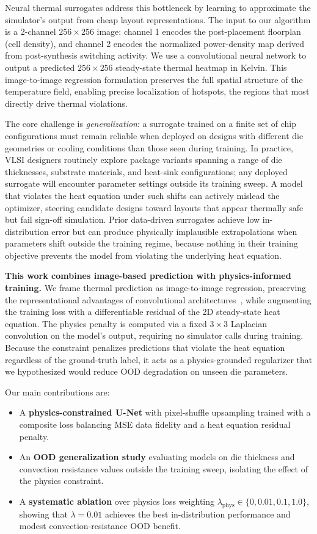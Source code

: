 \documentclass[10pt,twocolumn,letterpaper]{article}
\begin{document}
Neural thermal surrogates address this bottleneck by learning to
approximate the simulator's output from cheap layout representations.
The input to our algorithm is a 2-channel $256\times256$ image: channel
1 encodes the post-placement floorplan (cell density), and channel 2
encodes the normalized power-density map derived from post-synthesis
switching activity. We use a convolutional neural network to output a
predicted $256\times256$ steady-state thermal heatmap in Kelvin. This
image-to-image regression formulation preserves the full spatial
structure of the temperature field, enabling precise localization of
hotspots, the regions that most directly drive thermal violations.

The core challenge is \emph{generalization}: a surrogate trained on a
finite set of chip configurations must remain reliable when deployed on
designs with different die geometries or cooling conditions than those
seen during training. In practice, VLSI designers routinely explore
package variants spanning a range of die thicknesses, substrate
materials, and heat-sink configurations; any deployed surrogate will
encounter parameter settings outside its training sweep. A model that
violates the heat equation under such shifts can actively mislead the
optimizer, steering candidate designs toward layouts that appear
thermally safe but fail sign-off simulation. Prior data-driven
surrogates achieve low in-distribution error but can produce physically
implausible extrapolations when parameters shift outside the training
regime, because nothing in their training objective prevents the model
from violating the underlying heat equation.

\textbf{This work combines image-based prediction with physics-informed
training.} We frame thermal prediction as image-to-image
regression, preserving the representational advantages of
convolutional architectures~\cite{UNet}, while augmenting the
training loss with a differentiable residual of the 2D steady-state
heat equation. The physics penalty is computed via a fixed $3\times3$
Laplacian convolution on the model's output, requiring no simulator
calls during training. Because the constraint penalizes predictions
that violate the heat equation regardless of the ground-truth label,
it acts as a physics-grounded regularizer that we hypothesized would
reduce OOD degradation on unseen die parameters.

Our main contributions are:
\begin{itemize}
  \item A \textbf{physics-constrained U-Net} with pixel-shuffle
    upsampling trained with a composite loss balancing MSE data
    fidelity and a heat equation residual penalty.
  \item An \textbf{OOD generalization study} evaluating models on
    die thickness and convection resistance values outside the
    training sweep, isolating the effect of the physics constraint.
  \item A \textbf{systematic ablation} over physics loss weighting
    $\lambda_\text{phys} \in \{0, 0.01, 0.1, 1.0\}$, showing that
    $\lambda{=}0.01$ achieves the best in-distribution performance
    and modest convection-resistance OOD benefit.
\end{itemize}
\end{document}
